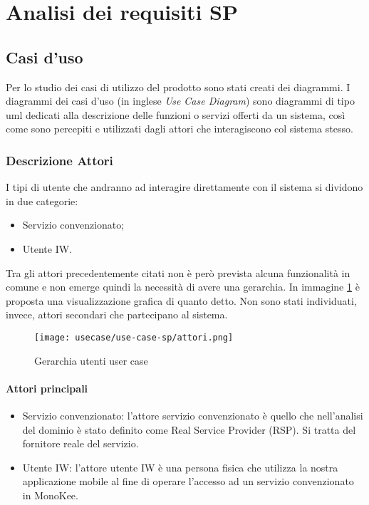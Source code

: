 \section{Analisi dei requisiti SP}
\subsection{Casi d'uso}

Per lo studio dei casi di utilizzo del prodotto sono stati creati dei diagrammi.
I diagrammi dei casi d'uso (in inglese \emph{Use Case Diagram}) sono diagrammi di tipo \gls{uml} dedicati alla descrizione delle funzioni o servizi offerti da un sistema, così come sono percepiti e utilizzati dagli attori che interagiscono col sistema stesso.

\subsubsection{Descrizione Attori}
I tipi di utente che andranno ad interagire direttamente con il sistema si dividono in due categorie: 
\begin{itemize}
    \item Servizio convenzionato;
    \item Utente IW.
\end{itemize}
Tra gli attori precedentemente citati non è però prevista alcuna funzionalità in comune e non emerge quindi la necessità di avere una gerarchia. In immagine \ref{fig:ger-actors-sp} è proposta una visualizzazione grafica di quanto detto.
Non sono stati individuati, invece, attori secondari che partecipano al sistema.
\begin{figure}[!h]    
    \centering
    \texttt{[image: usecase/use-case-sp/attori.png]} 
    \caption{Gerarchia utenti user case}
    \label{fig:ger-actors-sp} 
\end{figure}
\paragraph{Attori principali}
\begin{itemize}
    \item Servizio convenzionato: l’attore servizio convenzionato è quello che nell’analisi del dominio è stato definito come Real Service Provider (RSP). Si tratta del fornitore reale del servizio.
    \item Utente IW: l’attore utente IW è una persona fisica che utilizza la nostra applicazione mobile al fine di operare l’accesso ad un servizio convenzionato in MonoKee.
\end{itemize}

